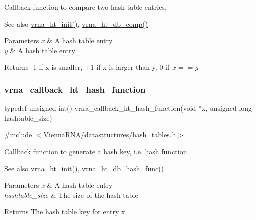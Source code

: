 Callback function to compare two hash table entries. 

\begin{DoxySeeAlso}{See also}
\mbox{\hyperlink{group__hash__table__utils_ga37d1c7e13087a2b7c1b87fda34577c29}{vrna\+\_\+ht\+\_\+init()}}, \mbox{\hyperlink{group__hash__table__utils_gac4ec0b8372d50d7347a63f140f340962}{vrna\+\_\+ht\+\_\+db\+\_\+comp()}} 
\end{DoxySeeAlso}

\begin{DoxyParams}{Parameters}
{\em x} & A hash table entry \\
\hline
{\em y} & A hash table entry \\
\hline
\end{DoxyParams}
\begin{DoxyReturn}{Returns}
-\/1 if x is smaller, +1 if x is larger than y. 0 if $x == y $ 
\end{DoxyReturn}
\mbox{\label{group__hash__table__utils_ga8533dc0cb44035d5fdb05e3c28922d2b}} 
\subsubsection{\texorpdfstring{vrna\_callback\_ht\_hash\_function}{vrna\_callback\_ht\_hash\_function}}
{\footnotesize\ttfamily typedef unsigned int() vrna\+\_\+callback\+\_\+ht\+\_\+hash\+\_\+function(void $\ast$x, unsigned long hashtable\+\_\+size)}



{\ttfamily \#include $<$\mbox{\hyperlink{hash__tables_8h}{Vienna\+R\+N\+A/datastructures/hash\+\_\+tables.\+h}}$>$}



Callback function to generate a hash key, i.\+e. hash function. 

\begin{DoxySeeAlso}{See also}
\mbox{\hyperlink{group__hash__table__utils_ga37d1c7e13087a2b7c1b87fda34577c29}{vrna\+\_\+ht\+\_\+init()}}, \mbox{\hyperlink{group__hash__table__utils_gad133721a3cd2f8ca259fe315d86035a7}{vrna\+\_\+ht\+\_\+db\+\_\+hash\+\_\+func()}} 
\end{DoxySeeAlso}

\begin{DoxyParams}{Parameters}
{\em x} & A hash table entry \\
\hline
{\em hashtable\+\_\+size} & The size of the hash table \\
\hline
\end{DoxyParams}
\begin{DoxyReturn}{Returns}
The hash table key for entry {\ttfamily x} 
\end{DoxyReturn}
\mbox{\label{group__hash__table__utils_ga3ff18cc70db8bb6f8cfee2c2b1542afc}} 
